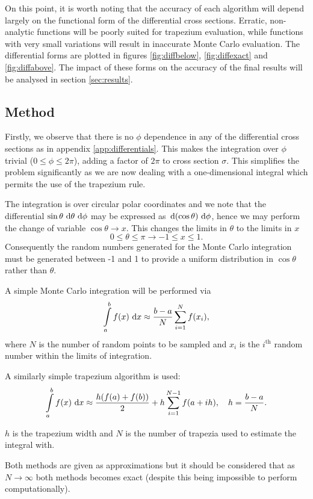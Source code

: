 \documentclass[]{article}
\begin{document}
On this point, it is worth noting that the accuracy of each algorithm will depend largely on the functional form of the differential cross sections. Erratic, non-analytic functions will be poorly suited for trapezium evaluation, while functions with very small variations will result in inaccurate Monte Carlo evaluation. The differential forms are plotted in figures \ref{fig:diffbelow}, \ref{fig:diffexact} and \ref{fig:diffabove}. The impact of these forms on the accuracy of the final results will be analysed in section \ref{sec:results}.

\subsection{Method}\label{ssec:method}

Firstly, we observe that there is no $\phi$ dependence in any of the differential cross sections as in appendix \ref{app:differentials}. This makes the integration over $\phi$ trivial ($0\leq\phi\leq2\pi$), adding a factor of $2\pi$ to cross section $\sigma$. This simplifies the problem significantly as we are now dealing with a one-dimensional integral which permits the use of the trapezium rule.

The integration is over circular polar coordinates and we note that the differential $\sin{\theta}\,\operatorname{d}\!{\theta}\,\operatorname{d}\!{\phi}$ may be expressed as $\,\operatorname{d}\!{(\cos{\theta})}\,\operatorname{d}\!{\phi}$, hence we may perform the change of variable $\cos{\theta} \to x$. This changes the limits in $\theta$ to the limits in $x$ $$0 \leq \theta \leq \pi \to -1 \leq x \leq 1.$$ Consequently the random numbers generated for the Monte Carlo integration must be generated between -1 and 1 to provide a uniform distribution in $\cos{\theta}$ rather than $\theta$.

A simple Monte Carlo integration will be performed via $$\int\limits_{a}^{b}f(x)\,\operatorname{d}\!{x} \approx \frac{b-a}{N}\sum\limits_{i=1}^{N}f(x_{i}),$$ where $N$ is the number of random points to be sampled and $x_{i}$ is the $i^{\mathrm{th}}$ random number within the limits of integration.

A similarly simple trapezium algorithm is used: $$\int\limits_{a}^{b}f(x)\,\operatorname{d}\!{x} \approx \frac{h(f(a) + f(b))}{2} + h\sum\limits_{i=1}^{N-1}f(a+ih),\quad h=\frac{b-a}{N}.$$

$h$ is the trapezium width and $N$ is the number of trapezia used to estimate the integral with.

Both methods are given as approximations but it should be considered that as $N \to \infty$ both methods becomes exact (despite this being impossible to perform computationally).
\end{document}
